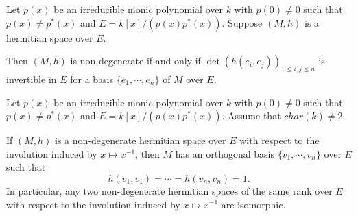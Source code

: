 \documentclass[10pt,a4paper]{amsart}
\begin{document}
\begin{prop} \label{non-degenerate} Let $p(x)$ be an irreducible monic polynomial over $k$ with $p(0)\neq 0$ such that $p(x)\neq p^*(x)$ and $E=k[x]/(p(x)p^*(x))$. 
Suppose $(M, h)$ is a hermitian space over $E$. 

Then $(M, h)$ is non-degenerate if and only if $\det(h(e_i, e_j))_{1\leq i, j \leq n}$ is invertible in $E$ for a basis $\{ e_1, \cdots, e_n \}$ of $M$ over $E$.
\end{prop}

\begin{prop} \label{orth-base}  Let $p(x)$ be an irreducible monic polynomial over $k$ with $p(0)\neq 0$ such that $p(x)\neq p^*(x)$ and $E=k[x]/(p(x)p^*(x))$.  Assume that $char(k)\neq 2$. 

If $(M, h)$ is a non-degenerate hermitian space over $E$ with respect to the involution induced by $x\mapsto x^{-1}$, then $M$ has an orthogonal basis $\{ v_1, \cdots, v_n \}$ over $E$ such that $$ h(v_1, v_1) = \cdots = h(v_n, v_n) =1. $$ In particular,  any two non-degenerate hermitian spaces of the same rank over $E$ with respect to the involution induced by $x\mapsto x^{-1}$ are isomorphic. 
\end{prop}
\end{document}
